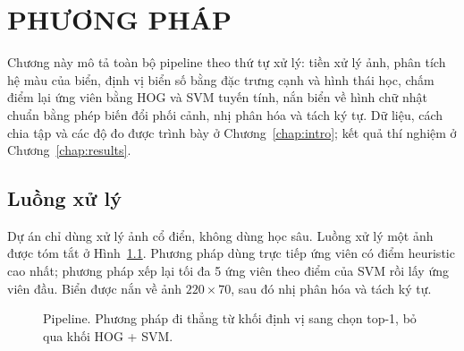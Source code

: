 \chapter{PHƯƠNG PHÁP}
\label{chap:method}

Chương này mô tả toàn bộ pipeline theo thứ tự xử lý: tiền xử lý ảnh, phân tích hệ màu của biển, định vị biển số bằng đặc trưng cạnh và hình thái học, chấm điểm lại ứng viên bằng HOG và SVM tuyến tính, nắn biển về hình chữ nhật chuẩn bằng phép biến đổi phối cảnh, nhị phân hóa và tách ký tự. Dữ liệu, cách chia tập và các độ đo được trình bày ở Chương~\ref{chap:intro}; kết quả thí nghiệm ở Chương~\ref{chap:results}.

\section{Luồng xử lý}
\label{sec:flow}

Dự án chỉ dùng xử lý ảnh cổ điển, không dùng học sâu. Luồng xử lý một ảnh được tóm tắt ở Hình~\ref{fig:pipeline}. Phương pháp  dùng trực tiếp ứng viên có điểm heuristic cao nhất; phương pháp  xếp lại tối đa 5 ứng viên theo điểm của SVM rồi lấy ứng viên đầu. Biển được nắn về ảnh $220\times 70$, sau đó nhị phân hóa và tách ký tự.

\begin{figure}[htbp]
\centering
{}
\caption[Pipeline]{Pipeline. Phương pháp  đi thẳng từ khối định vị sang chọn top-1, bỏ qua khối HOG + SVM.}
\label{fig:pipeline}
\end{figure}

